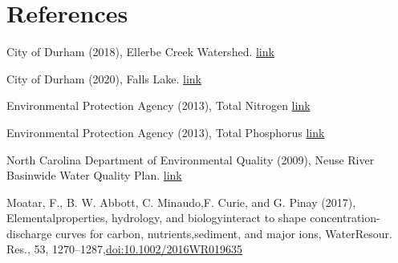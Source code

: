 \documentclass[12pt,]{article}
\begin{document}
\newpage

\hypertarget{references}{%
\section{References}\label{references}}

City of Durham (2018), Ellerbe Creek Watershed.
\href{https://durhamnc.gov/711/Ellerbe-Creek-Watershed}{link}

City of Durham (2020), Falls Lake.
\href{https://durhamnc.gov/716/Falls-Lake}{link}

Environmental Protection Agency (2013), Total Nitrogen
\href{www.epa.gov/sites/production/files/2015-09/documents/totalnitrogen.pdf}{link}

Environmental Protection Agency (2013), Total Phosphorus
\href{https://www.epa.gov/sites/production/files/2015-09/documents/totalphosphorus.pdf}{link}

North Carolina Department of Environmental Quality (2009), Neuse River
Basinwide Water Quality Plan.
\href{https://deq.nc.gov/about/divisions/water-resources/planning/basin-planning/water-resource-plans/neuse-2009}{link}

Moatar, F., B. W. Abbott, C. Minaudo,F. Curie, and G. Pinay (2017),
Elementalproperties, hydrology, and biologyinteract to shape
concentration-discharge curves for carbon, nutrients,sediment, and major
ions, WaterResour. Res., 53, 1270--1287,\url{doi:10.1002/2016WR019635}
\end{document}
